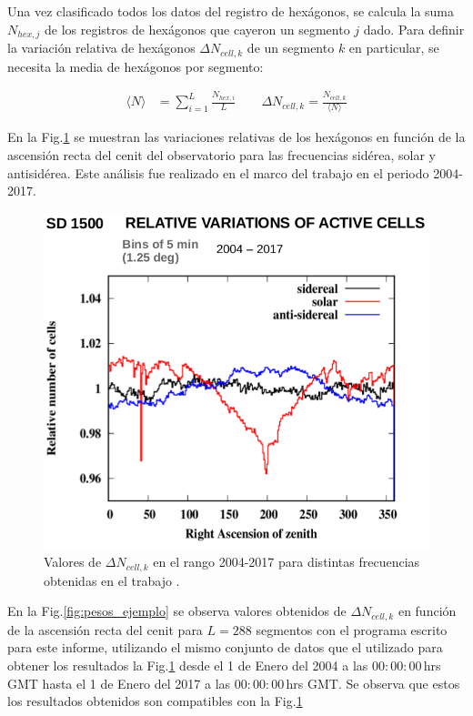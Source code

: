         Una vez clasificado todos los datos del registro de hexágonos, se calcula la suma  $N_{hex, j}$ de los registros de hexágonos que cayeron un segmento $j$ dado. Para definir la variación relativa de hexágonos  $\Delta N_{cell,k}$ de un segmento $k$ en particular, se necesita la media de hexágonos por segmento:
       
       \begin{align}
         \langle N \rangle &= \sum^{L}_{i=1} \frac{N_{hex, i}}{L}  \qquad
         \Delta N_{cell,k} = \frac{N_{cell, k}}{\langle N \rangle}  \label{epepe}
       \end{align}

      En la Fig.\ref{fig:pesos_referencia} se muestran las variaciones relativas de los hexágonos en función de la ascensión recta del cenit del observatorio para las frecuencias sidérea, solar y antisidérea. Este análisis fue realizado en el marco del trabajo \cite{referencia_pesos} en el periodo 2004-2017. 

          \begin{figure}[H]
          \centering
              \includegraphics[width=0.8\linewidth]{pesos_referencia.png}  
              \caption{Valores de $\Delta N_{cell, k}$ en el rango 2004-2017 para distintas frecuencias obtenidas en el trabajo \cite{referencia_pesos}.}
              \label{fig:pesos_referencia}
        \end{figure}

       En la Fig.\ref{fig:pesos_ejemplo} se observa valores obtenidos de $\Delta N_{cell,k}$ en función de la ascensión recta del cenit  para $L=288$ segmentos con el programa escrito para este informe, utilizando el mismo conjunto de datos que el utilizado para obtener los resultados la Fig.\ref{fig:pesos_referencia} desde el 1 de Enero del 2004 a las $00:00:00\,$hrs GMT  hasta el 1 de Enero del 2017 a las $00:00:00\,$hrs GMT. Se  observa que estos los resultados obtenidos son compatibles con la Fig.\ref{fig:pesos_referencia}
 

